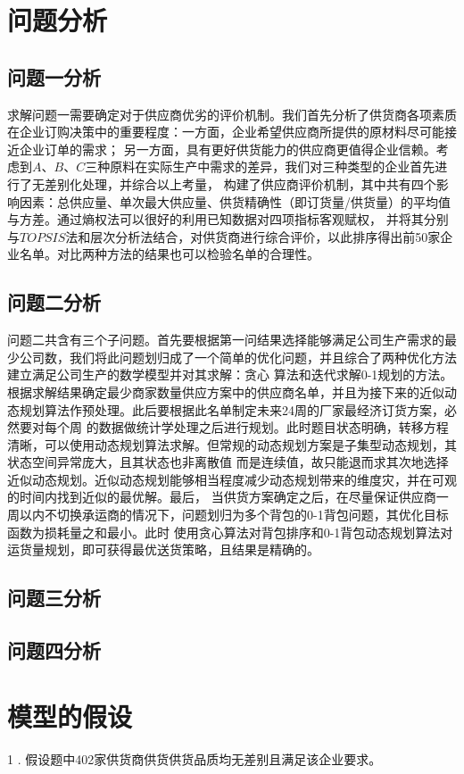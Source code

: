 \documentclass{cumcmthesis}
\begin{document}
\section{问题分析}
\subsection{问题一分析}
求解问题一需要确定对于供应商优劣的评价机制。我们首先分析了供货商各项素质在企业订购决策中的重要程度：一方面，企业希望供应商所提供的原材料尽可能接近企业订单的需求；
另一方面，具有更好供货能力的供应商更值得企业信赖。考虑到$A$、$B$、$C$三种原料在实际生产中需求的差异，我们对三种类型的企业首先进行了无差别化处理，并综合以上考量，
构建了供应商评价机制，其中共有四个影响因素：总供应量、单次最大供应量、供货精确性（即订货量/供货量）的平均值与方差。通过熵权法可以很好的利用已知数据对四项指标客观赋权，
并将其分别与$TOPSIS$法和层次分析法结合，对供货商进行综合评价，以此排序得出前50家企业名单。对比两种方法的结果也可以检验名单的合理性。

\subsection{问题二分析}
问题二共含有三个子问题。首先要根据第一问结果选择能够满足公司生产需求的最少公司数，我们将此问题划归成了一个简单的优化问题，并且综合了两种优化方法建立满足公司生产的数学模型并对其求解：贪心
算法和迭代求解0-1规划的方法。根据求解结果确定最少商家数量供应方案中的供应商名单，并且为接下来的近似动态规划算法作预处理。此后要根据此名单制定未来24周的厂家最经济订货方案，必然要对每个周
的数据做统计学处理之后进行规划。此时题目状态明确，转移方程清晰，可以使用动态规划算法求解。但常规的动态规划方案是子集型动态规划，其状态空间异常庞大，且其状态也非离散值
而是连续值，故只能退而求其次地选择近似动态规划。近似动态规划能够相当程度减少动态规划带来的维度灾，并在可观的时间内找到近似的最优解。最后，
当供货方案确定之后，在尽量保证供应商一周以内不切换承运商的情况下，问题划归为多个背包的0-1背包问题，其优化目标函数为损耗量之和最小。此时
使用贪心算法对背包排序和0-1背包动态规划算法对运货量规划，即可获得最优送货策略，且结果是精确的。

\subsection{问题三分析}
\subsection{问题四分析}

\section{模型的假设}
1 . 假设题中402家供货商供货供货品质均无差别且满足该企业要求。
\end{document}
